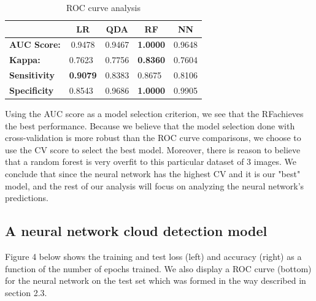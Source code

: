 \documentclass{article}\usepackage[]{graphicx}\usepackage[]{color}
\begin{document}
\begin{table}[h!]
\centering
\caption{ROC curve analysis}
\label{my-label}
\begin{tabular}{|l|l|l|l|l|}
\hline
\multicolumn{1}{|c|}{}                    & \multicolumn{1}{c|}{\textbf{LR}} & \multicolumn{1}{c|}{\textbf{QDA}} & \multicolumn{1}{c|}{\textbf{RF}}     & \multicolumn{1}{c|}{\textbf{NN}} \\ \hline
\multicolumn{1}{|c|}{\textbf{AUC Score:}} & \multicolumn{1}{c|}{0.9478}      & \multicolumn{1}{c|}{0.9467}       & \multicolumn{1}{c|}{\textbf{1.0000}} & \multicolumn{1}{c|}{0.9648}      \\ \hline
\textbf{Kappa:}                           & 0.7623                           & 0.7756                            & \textbf{0.8360}                      & 0.7604                           \\ \hline
\textbf{Sensitivity}                      & \textbf{0.9079}                  & 0.8383                            & 0.8675                               & 0.8106                           \\ \hline
\textbf{Specificity}                      & 0.8543                           & 0.9686                            & \textbf{1.0000}                      & 0.9905                           \\ \hline
\end{tabular}
\end{table}

Using the AUC score as a model selection criterion, we see that the RFachieves the best performance. Because we believe that the model selection done with cross-validation is more robust than the ROC curve comparisons, we choose to use the CV score to select the best model. Moreover, there is reason to believe that a random forest is very overfit to this particular dataset of 3 images. We conclude that since the neural network has the highest CV and it is our "best" model, and the rest of our analysis will focus on analyzing the neural network's predictions. 

\subsection{A neural network cloud detection model}

Figure 4 below shows the training and test loss (left) and accuracy (right) as a function of the number of epochs trained. We also display a ROC curve (bottom) for the neural network on the test set which was formed in the way described in section 2.3.
\end{document}

